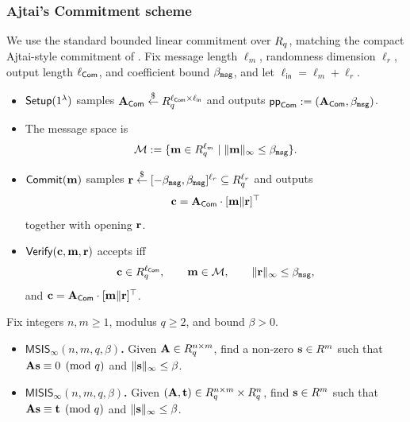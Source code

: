 \subsubsection{Ajtai's Commitment scheme}
We use the standard bounded linear commitment over \(R_q\), matching the compact Ajtai-style commitment of
\cite[Definition~13]{EPRINT:AttCraKoh21}. Fix message length \(\ell_m\), randomness dimension \(\ell_r\), output length
\(\ell_{\mathsf{Com}}\), and coefficient bound \(\beta_{\mathtt{msg}}\), and let \(\ell_{\mathsf{in}}=\ell_m+\ell_r\).
\begin{itemize}
  \item \(\mathsf{Setup}(1^\lambda)\) samples \(\mathbf{A}_{\mathsf{Com}}\overset{\$}{\leftarrow} R_q^{\ell_{\mathsf{Com}}\times \ell_{\mathsf{in}}}\) and outputs
  \(\mathsf{pp}_{\mathsf{Com}}:=(\mathbf{A}_{\mathsf{Com}},\beta_{\mathtt{msg}})\).
  \item The message space is
  \[
    \mathcal{M}:=\{\mathbf{m}\in R_q^{\ell_m}\mid \|\mathbf{m}\|_\infty\le \beta_{\mathtt{msg}}\}.
  \]
  \item \(\mathsf{Commit}(\mathbf{m})\) samples
  \(\mathbf{r}\overset{\$}{\leftarrow}[-\beta_{\mathtt{msg}},\beta_{\mathtt{msg}}]^{\ell_r}\subseteq R_q^{\ell_r}\) and outputs
  \[
    \mathbf{c}=\mathbf{A}_{\mathsf{Com}}\cdot[\mathbf{m}\Vert \mathbf{r}]^\top
  \]
  together with opening \(\mathbf{r}\).
  \item \(\mathsf{Verify}(\mathbf{c},\mathbf{m},\mathbf{r})\) accepts iff
  \[
    \mathbf{c}\in R_q^{\ell_{\mathsf{Com}}},\qquad
    \mathbf{m}\in\mathcal{M},\qquad
    \|\mathbf{r}\|_\infty\le \beta_{\mathtt{msg}},
  \]
  and \(\mathbf{c}=\mathbf{A}_{\mathsf{Com}}\cdot[\mathbf{m}\Vert \mathbf{r}]^\top\).
\end{itemize}

\begin{definition}\label{def:sis-isis}
Fix integers \(n,m\ge 1\), modulus \(q\ge 2\), and bound \(\beta>0\).
\begin{itemize}[leftmargin=1.25em]
  \item \textbf{\(\mathsf{MSIS}_\infty(n,m,q,\beta)\).} Given \(\mathbf{A}\in R_q^{n\times m}\), find a non-zero
  \(\mathbf{s}\in R^m\) such that \(\mathbf{A}\mathbf{s}\equiv 0 \pmod q\) and \(\|\mathbf{s}\|_\infty\le \beta\).
  \item \textbf{\(\mathsf{MISIS}_\infty(n,m,q,\beta)\).} Given \((\mathbf{A},\mathbf{t})\in R_q^{n\times m}\times R_q^n\), find
  \(\mathbf{s}\in R^m\) such that \(\mathbf{A}\mathbf{s}\equiv \mathbf{t} \pmod q\) and
  \(\|\mathbf{s}\|_\infty\le \beta\).
\end{itemize}
\end{definition}

